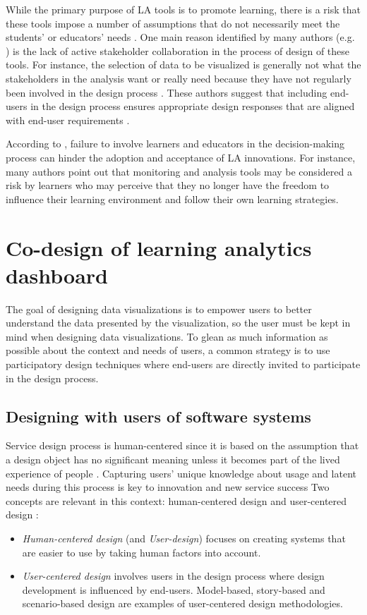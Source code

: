 \documentclass[preprint,12pt]{elsarticle}
\begin{document}
While the primary purpose of LA tools is to promote learning, there is a risk that these tools impose a number of assumptions that do not necessarily meet the students' or educators' needs \cite{dawson2015challenging}. One main reason identified by many authors (e.g. \cite{buckingham2019human}) is the lack of active stakeholder collaboration in the process of design of these tools. 
For instance, the selection of data to be visualized is generally not what the stakeholders in the analysis want or really need because they have not regularly been involved in the design process \citep{Holstein2017}.
These authors suggest that including end-users in the design process ensures appropriate design responses that are aligned with end-user requirements \cite{taffe2015hybrid}. 

According to \citet{beattie2014creepy}, failure to involve learners and educators in the decision-making process can hinder the adoption and acceptance of LA innovations. 
For instance, many authors point out that monitoring and analysis tools may be considered a risk by learners who may perceive that they no longer have the freedom to influence their learning environment and follow their own learning strategies.

\section{Co-design of learning analytics dashboard}
The goal of designing data visualizations is to empower users to better understand the data presented by the visualization, so the user must be kept in mind when designing data visualizations. 
To glean as much information as possible about the context and needs of users, 
a common strategy is to use participatory design techniques where end-users are directly invited to participate in the design process. 

\subsection{Designing with users of software systems}
Service design process is human-centered since it is based on the assumption that a design object has no significant meaning unless it becomes part of the lived experience of people \cite{krippendorff2005semantic}.
Capturing users' unique knowledge about usage and latent needs during this process  is key to innovation and new service success \cite{mahr2014value}
Two concepts are relevant in this context: human-centered design and user-centered design :
\begin{itemize}
    \item \textit{Human-centered design} (and \textit{User-design}) focuses on creating systems that are easier to use by taking human factors into account.
    \item \textit{User-centered design} involves users in the design process where design development is influenced by end-users. Model-based, story-based and scenario-based design are examples of user-centered design methodologies. 
\end{itemize}
\end{document}
